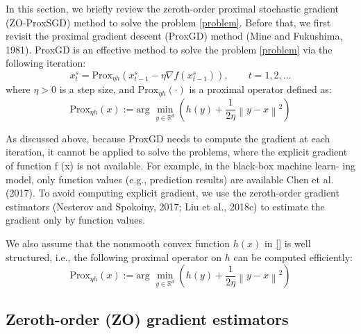\documentclass{article}
\newcommand*{\R}{\mathbb{R}}
\newcommand*{\Po}{\text{Prox}}
\newcommand{\norm}[1]{\left\lVert#1\right\rVert}
\theoremstyle{definition}
\theoremstyle{remark}
\begin{document}
{\color{Green}
In this section, we briefly review the zeroth-order proximal stochastic gradient (ZO-ProxSGD) method to solve the problem \eqref{problem}. Before that, we first revisit the proximal gradient descent (ProxGD) method (Mine and Fukushima, 1981).
ProxGD is an effective method to solve the problem \eqref{problem} via the following iteration:
\begin{equation}
x_{t}^s= \Po_{\eta h}(x_{t-1}^s - \eta \nabla f(x_{t-1}^s)),\qquad t=1, 2, \ldots
\end{equation}
where $\eta > 0$ is a step size, and $\Po_{\eta h}(\cdot)$ is a proximal operator defined as:
\begin{equation}
\Po_{\eta h}(x) := \text{arg}\,\,\min_{y\in\R^d}\left(h(y)+\frac{1}{2\eta}\norm{y-x}^2\right)
\end{equation}

As discussed above, because ProxGD needs to compute
the gradient at each iteration, it cannot be applied to solve
the problems, where the explicit gradient of function f (x) is
not available. For example, in the black-box machine learn-
ing model, only function values (e.g., prediction results) are
available Chen et al. (2017). To avoid computing explicit gradient, we use the zeroth-order gradient estimators (Nesterov and Spokoiny, 2017; Liu et al., 2018c) to estimate the
gradient only by function values.
{\color{Violet}
We also assume that the
nonsmooth convex function $h(x)$ in \eqref{} is well structured, i.e., the following proximal operator on $h$ can be computed
efficiently:
\begin{equation}
\Po_{\eta h}(x) := \text{arg}\,\,\min_{y\in\R^d}\left(h(y)+\frac{1}{2\eta}\norm{y-x}^2\right)
\end{equation}

}
}
\subsection{Zeroth-order (ZO) gradient estimators}
\end{document}
